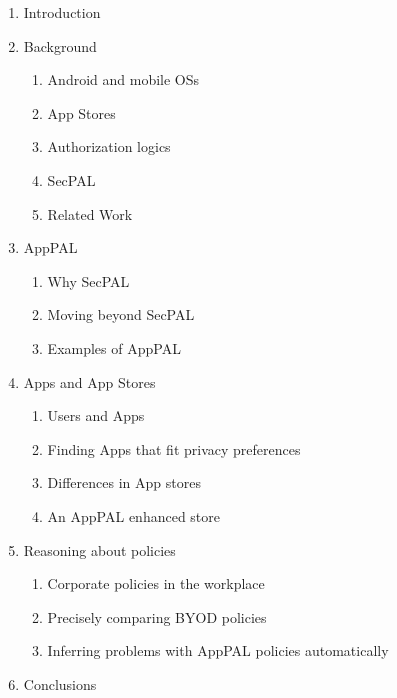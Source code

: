 \documentclass[a4paper]{scrartcl}
\begin{document}
\begin{enumerate}
\item Introduction
\item Background
  \begin{enumerate}[1)]
  \item Android and mobile OSs
  \item App Stores
  \item Authorization logics
  \item SecPAL
  \item Related Work
  \end{enumerate}
\item AppPAL
  \begin{enumerate}[1)]
  \item Why SecPAL
  \item Moving beyond SecPAL 
  \item Examples of AppPAL
  \end{enumerate}
\item Apps and App Stores
  \begin{enumerate}[1)]
  \item Users and Apps
  \item Finding Apps that fit privacy preferences
  \item Differences in App stores
  \item An AppPAL enhanced store
  \end{enumerate}
\item Reasoning about policies
  \begin{enumerate}[1)]
  \item Corporate policies in the workplace
  \item Precisely comparing BYOD policies
  \item Inferring problems with AppPAL policies automatically
  \end{enumerate}
\item Conclusions 
\end{enumerate}
\end{document}
